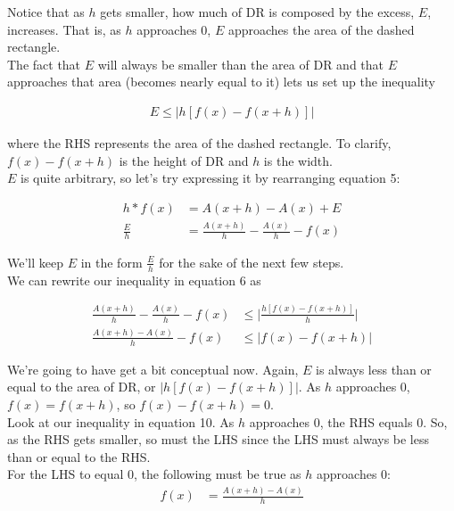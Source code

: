 \documentclass{article}
\begin{document}
\noindent
Notice that as $h$ gets smaller, how much of DR is composed by the excess, $E$, increases. That is, as $h$ approaches $0$, $E$ approaches the area of the dashed rectangle. \\

\noindent
The fact that $E$ will always be smaller than the area of DR and that $E$ approaches that area (becomes nearly equal to it) lets us set up the inequality

\begin{align}
E \leq \lvert h[f(x)-f(x+h)] \rvert
\end{align} 

\noindent
where the RHS represents the area of the dashed rectangle. To clarify, $f(x)-f(x+h)$ is the height of DR and $h$ is the width. \\

\noindent
$E$ is quite arbitrary, so let's try expressing it by rearranging equation 5:

\begin{align}
h*f(x) &= A(x+h)-A(x)+E \\
\frac{E}{h} &= \frac{A(x+h)}{h} - \frac{A(x)}{h} - f(x)
\end{align}

\noindent
We'll keep $E$ in the form $\frac{E}{h}$ for the sake of the next few steps. \\

\noindent
We can rewrite our inequality in equation 6 as

\begin{align}
\frac{A(x+h)}{h} -  \frac{A(x)}{h} - f(x) &\leq \lvert\frac{h[f(x)-f(x+h)]}{h} \rvert \\
\frac{A(x+h)-A(x)}{h} - f(x) &\leq \lvert f(x)-f(x+h) \rvert
\end{align}

\noindent
We're going to have get a bit conceptual now. Again, $E$ is always less than or equal to the area of DR, or $\lvert h[f(x)-f(x+h)] \rvert$. As $h$ approaches 0, $f(x)=f(x+h)$, so $f(x)-f(x+h)=0$. \\

\noindent
Look at our inequality in equation 10. As $h$ approaches $0$, the RHS equals 0. So, as the RHS gets smaller, so must the LHS since the LHS must always be less than or equal to the RHS. \\

\noindent
For the LHS to equal 0, the following must be true as $h$ approaches 0:
\begin{align}
f(x) &= \frac{A(x+h)-A(x)}{h}
\end{align}
\end{document}
